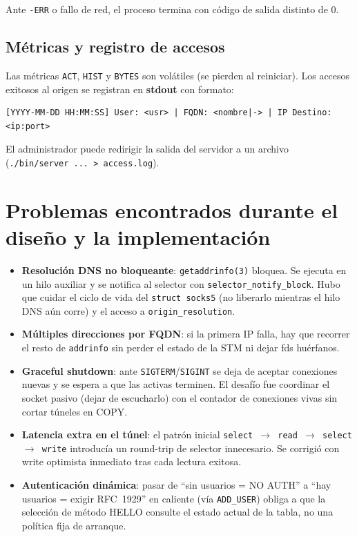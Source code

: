 \documentclass[12pt,a4paper]{article}
\begin{document}
Ante \texttt{-ERR} o fallo de red, el proceso termina con código de salida distinto de 0.

\subsection{Métricas y registro de accesos}

Las métricas \texttt{ACT}, \texttt{HIST} y \texttt{BYTES} son volátiles (se pierden
al reiniciar). Los accesos exitosos al origen se registran en \textbf{stdout} con
formato:

\begin{verbatim}
[YYYY-MM-DD HH:MM:SS] User: <usr> | FQDN: <nombre|-> | IP Destino: <ip:port>
\end{verbatim}

El administrador puede redirigir la salida del servidor a un archivo
(\texttt{./bin/server ... > access.log}).

\section{Problemas encontrados durante el diseño y la implementación}

\begin{itemize}
    \item \textbf{Resolución DNS no bloqueante}: \texttt{getaddrinfo(3)} bloquea.
          Se ejecuta en un hilo auxiliar y se notifica al selector con
          \texttt{selector\_notify\_block}. Hubo que cuidar el ciclo de vida del
          \texttt{struct socks5} (no liberarlo mientras el hilo DNS aún corre) y
          el acceso a \texttt{origin\_resolution}.
    \item \textbf{Múltiples direcciones por FQDN}: si la primera IP falla, hay que
          recorrer el resto de \texttt{addrinfo} sin perder el estado de la STM ni
          dejar fds huérfanos.
    \item \textbf{Graceful shutdown}: ante \texttt{SIGTERM}/\texttt{SIGINT} se deja
          de aceptar conexiones nuevas y se espera a que las activas terminen. El
          desafío fue coordinar el socket pasivo (dejar de escucharlo) con el
          contador de conexiones vivas sin cortar túneles en COPY.
    \item \textbf{Latencia extra en el túnel}: el patrón inicial
          \texttt{select $\rightarrow$ read $\rightarrow$ select $\rightarrow$ write}
          introducía un round-trip de selector innecesario. Se corrigió con write
          optimista inmediato tras cada lectura exitosa.
    \item \textbf{Autenticación dinámica}: pasar de ``sin usuarios = NO AUTH'' a
          ``hay usuarios = exigir RFC~1929'' en caliente (vía \texttt{ADD\_USER})
          obliga a que la selección de método HELLO consulte el estado actual de
          la tabla, no una política fija de arranque.
\end{itemize}
\end{document}

